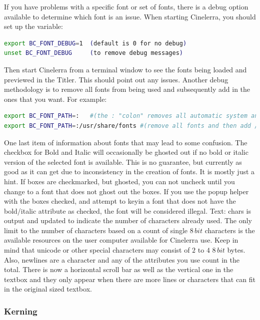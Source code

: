 {If you have problems with a specific font or set of fonts, there is a debug option available to determine which font is an issue. When starting Cinelerra, you should set up the variable:

\vspace{1ex}
\begin{lstlisting}[language=Bash,numbers=none]
export BC_FONT_DEBUG=1	(default is 0 for no debug)
unset BC_FONT_DEBUG		(to remove debug messages)
\end{lstlisting}

Then start Cinelerra from a terminal window to see the fonts being loaded and previewed in the Titler. This should point out any issues. Another debug methodology is to remove all fonts from being used and subsequently add in the ones that you want. For example:

\vspace{1ex}
\begin{lstlisting}[language=Bash,numbers=none]
export BC_FONT_PATH=:   #(the : "colon" removes all automatic system and Cinelerra fonts)
export BC_FONT_PATH=:/usr/share/fonts #(remove all fonts and then add /usr/shar/fonts)
\end{lstlisting}

One last item of information about fonts that may lead to some confusion. The checkbox for Bold and Italic will occasionally be ghosted out if no bold or italic version of the selected font is available. This is no guarantee, but currently as good as it can get due to inconsistency in the creation of fonts. It is mostly just a hint. If boxes are checkmarked, but ghosted, you can not uncheck until you change to a font that does not ghost out the boxes. If you use the popup helper with the boxes checked, and attempt to keyin a font that does not have the bold/italic attribute as checked, the font will be considered illegal.
Text: chars is output and updated to indicate the number of characters already used. The only limit to the number of characters based on a count of single $8\, bit$ characters is the available resources on the user computer available for Cinelerra use. Keep in mind that unicode or other special characters may consist of $2$ to $4$ $8\,bit$ bytes. Also, newlines are a character and any of the attributes you use count in the total. There is now a horizontal scroll bar as well as the vertical one in the textbox and they only appear when there are more lines or characters that can fit in the original sized textbox.

\subsubsection*{Kerning}%
\label{ssub:kerning}

}
